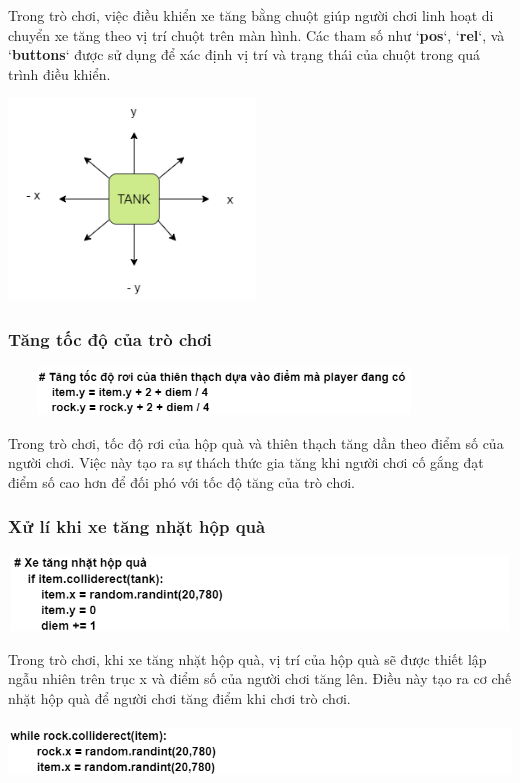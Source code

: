 \documentclass[a4paper]{article}
\begin{document}
Trong trò chơi, việc điều khiển xe tăng bằng chuột giúp người chơi linh
hoạt di chuyển xe tăng theo vị trí chuột trên màn hình. Các tham số như
`\textbf{pos}`, `\textbf{rel}`, và `\textbf{buttons}` được sử dụng để
xác định vị trí và trạng thái của chuột trong quá trình điều khiển.

\includegraphics[width=2.58333in,height=2.10139in]{image13.png}
\subsubsection{Tăng tốc độ của trò chơi}
\includegraphics[width=4.5in,height=0.5in]{image13_1.png}

Trong trò chơi, tốc độ rơi của hộp quà và thiên thạch tăng dần theo điểm
số của người chơi. Việc này tạo ra sự thách thức gia tăng khi người chơi
cố gắng đạt điểm số cao hơn để đối phó với tốc độ tăng của trò chơi.
\subsubsection{Xử lí khi xe tăng nhặt hộp quà}
\includegraphics[width=5.5in,height=0.8in]{image13_2.png}

Trong trò chơi, khi xe tăng nhặt hộp quà, vị trí của hộp quà sẽ được
thiết lập ngẫu nhiên trên trục x và điểm số của người chơi tăng lên.
Điều này tạo ra cơ chế nhặt hộp quà để người chơi tăng điểm khi chơi trò
chơi.

\includegraphics[width=5.5in,height=0.6in]{image13_3.png}
\end{document}
